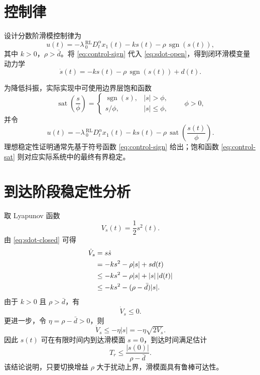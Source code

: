\documentclass[UTF8,a4paper,11pt]{ctexart}
\newcommand{\sat}{\operatorname{sat}}
\newcommand{\sgn}{\operatorname{sgn}}
\begin{document}
\section{控制律}

设计分数阶滑模控制律为
\begin{equation}
  u(t)
  =
  -\lambda\,{}_0^{\mathrm{RL}}D_t^\alpha x_1(t)
  -k s(t)
  -\rho\,\sgn(s(t)),
  \label{eq:control-sign}
\end{equation}
其中 $k>0$，$\rho>\bar d$。将 \eqref{eq:control-sign} 代入 \eqref{eq:sdot-open}，得到闭环滑模变量动力学
\begin{equation}
  \dot{s}(t)
  =
  -k s(t)-\rho\,\sgn(s(t))+d(t).
  \label{eq:sdot-closed}
\end{equation}

为降低抖振，实际实现中可使用边界层饱和函数
\begin{equation}
  \sat\!\left(\frac{s}{\phi}\right)
  =
  \begin{cases}
    \sgn(s), & |s|>\phi,\\[2mm]
    s/\phi, & |s|\le \phi,
  \end{cases}
  \qquad \phi>0,
\end{equation}
并令
\begin{equation}
  u(t)
  =
  -\lambda\,{}_0^{\mathrm{RL}}D_t^\alpha x_1(t)
  -k s(t)
  -\rho\,\sat\!\left(\frac{s(t)}{\phi}\right).
  \label{eq:control-sat}
\end{equation}
理想稳定性证明通常先基于符号函数 \eqref{eq:control-sign} 给出；饱和函数 \eqref{eq:control-sat} 则对应实际系统中的最终有界稳定。

\section{到达阶段稳定性分析}

取 Lyapunov 函数
\begin{equation}
  V_s(t)=\frac{1}{2}s^2(t).
\end{equation}
由 \eqref{eq:sdot-closed} 可得
\begin{align}
  \dot V_s
  &=
  s\dot{s} \notag\\
  &=
  -k s^2-\rho |s|+s d(t) \notag\\
  &\le
  -k s^2-\rho |s|+|s|\,|d(t)| \notag\\
  &\le
  -k s^2-(\rho-\bar d)|s|.
  \label{eq:reaching}
\end{align}
由于 $k>0$ 且 $\rho>\bar d$，有
\begin{equation}
  \dot V_s\le 0.
\end{equation}
更进一步，令 $\eta=\rho-\bar d>0$，则
\begin{equation}
  \dot V_s\le -\eta |s|
  =
  -\eta\sqrt{2V_s}.
\end{equation}
因此 $s(t)$ 可在有限时间内到达滑模面 $s=0$，到达时间满足估计
\begin{equation}
  T_r
  \le
  \frac{|s(0)|}{\rho-\bar d}.
\end{equation}
该结论说明，只要切换增益 $\rho$ 大于扰动上界，滑模面具有鲁棒可达性。
\end{document}
